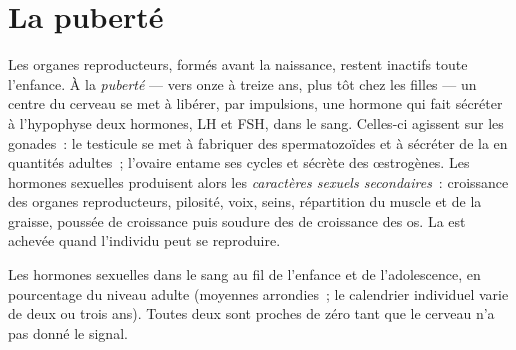 \section{La puberté}

\begin{proposition}[La puberté]\label{prop:g11:becoming-male-female:puberty}
Les organes reproducteurs, formés avant la naissance, restent inactifs
toute l'enfance. À la \emph{puberté} --- vers onze à
treize ans, plus tôt chez les filles --- un centre du cerveau se met à
libérer, par impulsions, une hormone qui fait sécréter à l'hypophyse
deux hormones, LH et FSH, dans le sang. Celles-ci agissent sur les
gonades~: le testicule se met à fabriquer des spermatozoïdes et à
sécréter de la  en quantités adultes~; l'ovaire entame ses
cycles et sécrète des œstrogènes. Les hormones sexuelles produisent
alors les \emph{caractères sexuels secondaires}~: croissance des
organes reproducteurs, pilosité, voix, seins, répartition du muscle et
de la graisse, poussée de croissance puis soudure des  de
croissance des os. La  est achevée quand l'individu peut se
reproduire.
\end{proposition}
\admitted

\begin{omfigure}

{\small Les hormones sexuelles dans le sang au fil de l'enfance et de
l'adolescence, en pourcentage du niveau adulte (moyennes arrondies~; le
calendrier individuel varie de deux ou trois ans). Toutes deux sont
proches de zéro tant que le cerveau n'a pas donné le signal.}
\end{omfigure}


